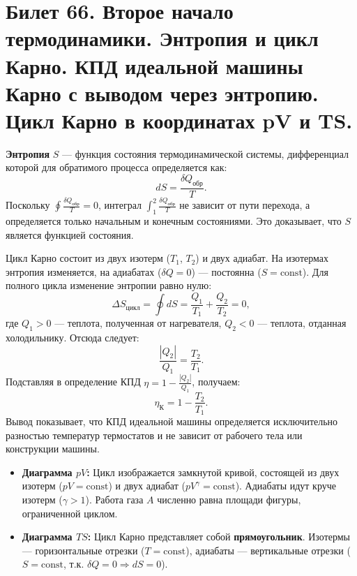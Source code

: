 \section{Билет 66. Второе начало термодинамики. Энтропия и цикл Карно. КПД идеальной машины Карно с выводом через энтропию. Цикл Карно в координатах pV и TS.}

\begin{definition}
\textbf{Энтропия} $S$ --- функция состояния термодинамической системы, дифференциал которой для обратимого процесса определяется как:
\begin{equation}
    dS = \frac{\delta Q_{\text{обр}}}{T}. \label{eq:entropy_def_66}
\end{equation}
Поскольку $\oint \frac{\delta Q_{\text{обр}}}{T} = 0$, интеграл $\int_1^2 \frac{\delta Q_{\text{обр}}}{T}$ не зависит от пути перехода, а определяется только начальным и конечным состояниями. Это доказывает, что $S$ является функцией состояния.
\end{definition}

\begin{theorem}
Цикл Карно состоит из двух изотерм ($T_1$, $T_2$) и двух адиабат. На изотермах энтропия изменяется, на адиабатах ($\delta Q=0$) --- постоянна ($S=\text{const}$).
Для полного цикла изменение энтропии равно нулю:
\begin{equation}
    \Delta S_{\text{цикл}} = \oint dS = \frac{Q_1}{T_1} + \frac{Q_2}{T_2} = 0, \label{eq:carnot_entropy}
\end{equation}
где $Q_1 > 0$ --- теплота, полученная от нагревателя, $Q_2 < 0$ --- теплота, отданная холодильнику.
Отсюда следует:
\begin{equation}
    \frac{|Q_2|}{Q_1} = \frac{T_2}{T_1}.
\end{equation}
Подставляя в определение КПД $\eta = 1 - \frac{|Q_2|}{Q_1}$, получаем:
\begin{equation}
    \eta_{\text{К}} = 1 - \frac{T_2}{T_1}. \label{eq:carnot_eff_entropy_66}
\end{equation}
Вывод показывает, что КПД идеальной машины определяется исключительно разностью температур термостатов и не зависит от рабочего тела или конструкции машины.
\end{theorem}

\begin{property}
\begin{itemize}
    \item \textbf{Диаграмма $pV$:} Цикл изображается замкнутой кривой, состоящей из двух изотерм ($pV=\text{const}$) и двух адиабат ($pV^\gamma=\text{const}$). Адиабаты идут круче изотерм ($\gamma>1$). Работа газа $A$ численно равна площади фигуры, ограниченной циклом.
    \item \textbf{Диаграмма $TS$:} Цикл Карно представляет собой \textbf{прямоугольник}. Изотермы --- горизонтальные отрезки ($T=\text{const}$), адиабаты --- вертикальные отрезки ($S=\text{const}$, т.к. $\delta Q=0 \Rightarrow dS=0$).
\end{itemize}
\end{property}

